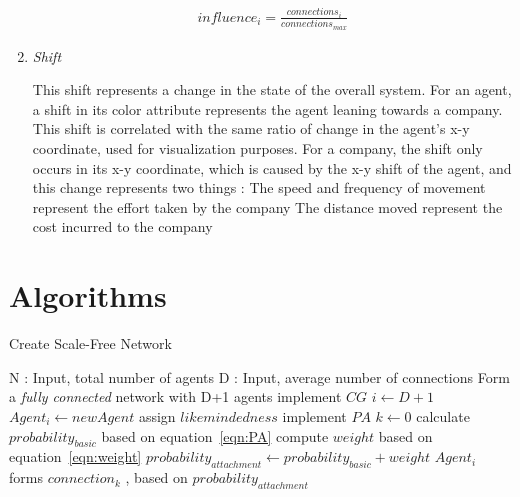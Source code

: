 \begin{enumerate}
\begin{eqnarray}
influence_{i} = \frac{connections_i}{connections_{max}} 
\label{eqn:influence} 
\end{eqnarray}

\item \emph{Shift}

This shift represents a change in the state of the overall system. For an agent, a shift in its color attribute represents the agent leaning towards a company. This shift is correlated with the same ratio of change in the agent's x-y coordinate, used for visualization purposes.
For a company, the shift only occurs in its x-y coordinate, which is caused by the x-y shift of the agent, and this change represents two things : 
\subitem[a] The speed and frequency of movement represent the effort taken by the company
\subitem[b] The distance moved represent the cost incurred to the company
\end{enumerate}

\clearpage

\section{Algorithms}

\begin{algorithm}
\caption{Create Scale-Free Network}
\label{alg1}
\begin{algorithmic}
\STATE N : Input, total number of agents
\STATE D : Input, average number of connections
	\STATE Form a \emph{fully connected} network with D+1 agents
\ENDIF 
\STATE implement $CG$
\STATE $i \gets D+1$
	\STATE $Agent_i \gets newAgent$
	\STATE assign $likemindedness$ 
	\STATE implement $PA$
	\STATE $k \gets 0$
		\STATE calculate $probability_{basic}$ based on equation~\ref{eqn:PA}
		\STATE compute $weight$ based on equation~\ref{eqn:weight} 
		\STATE $probability_{attachment} \gets  probability_{basic} + weight$ 
		\STATE $Agent_i$ forms $connection_k$ , based on $probability_{attachment}$
	\ENDWHILE	
\ENDWHILE
\end{algorithmic}
\end{algorithm}

\clearpage

